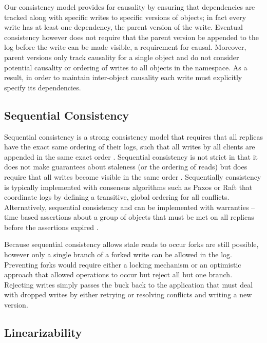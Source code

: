 \documentclass[10pt,conference,compsocconf,letterpaper]{IEEEtran}
\begin{document}
Our consistency model provides for causality by ensuring that dependencies are tracked along with specific writes to specific versions of objects; in fact every write has at least one dependency, the parent version of the write. Eventual consistency however does not require that the parent version be appended to the log before the write can be made visible, a requirement for causal. Moreover, parent versions only track causality for a single object and do not consider potential causality or ordering of writes to all objects in the namespace. As a result, in order to maintain inter-object causality each write must explicitly specify its dependencies.

\subsection{Sequential Consistency}

Sequential consistency is a strong consistency model that requires that all replicas have the exact same ordering of their logs, such that all writes by all clients are appended in the same exact order \cite{attiya_sequential_1994}. Sequential consistency is not strict in that it does not make guarantees about staleness (or the ordering of reads) but does require that all writes become visible in the same order \cite{bermbach_consistency_2013}. Sequentially consistency is typically implemented with consensus algorithms such as Paxos \cite{lamport_fast_2006} or Raft \cite{ongaro_search_2014} that coordinate logs by defining a transitive, global ordering for all conflicts. Alternatively, sequential consistency and can be implemented with warranties -- time based assertions about a group of objects that must be met on all replicas before the assertions expired \cite{liu_warranties_2014}.

Because sequential consistency allows stale reads to occur forks are still possible, however only a single branch of a forked write can be allowed in the log. Preventing forks would require either a locking mechanism or an optimistic approach that allowed operations to occur but reject all but one branch. Rejecting writes simply passes the buck back to the application that must deal with dropped writes by either retrying or resolving conflicts and writing a new version.

\subsection{Linearizability}
\end{document}
